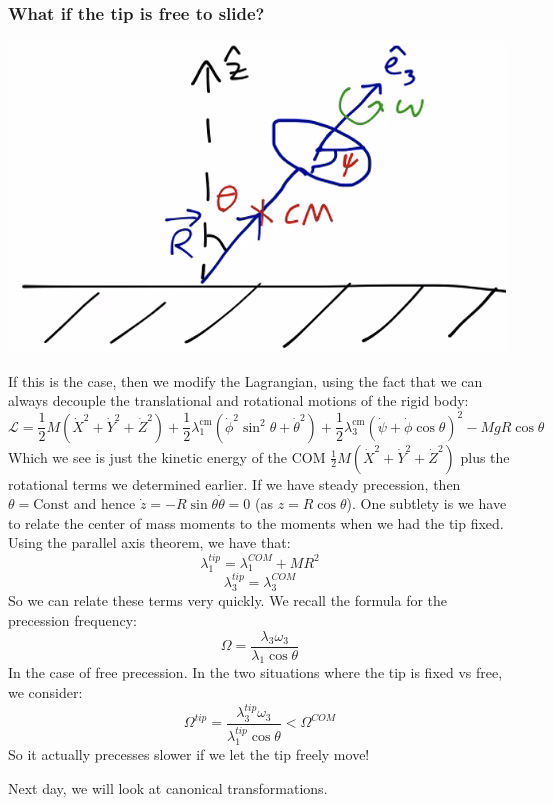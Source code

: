 \documentclass[../PHYS306Notes.tex]{subfiles}
\begin{document}
\subsubsection{What if the tip is free to slide?}
\begin{center}
    \includegraphics[scale=0.7]{Lecture-34/l34-img7.png}
\end{center}
If this is the case, then we modify the Lagrangian, using the fact that we can always decouple the translational and rotational motions of the rigid body:
\[\mathcal{L}=\frac{1}{2} M\left(\dot{X}^{2}+\dot{Y}^{2}+\dot{Z}^{2}\right)+\frac{1}{2} \lambda_{1}^{\mathrm{cm}}\left(\dot{\phi}^{2} \sin ^{2} \theta+\dot{\theta}^{2}\right)+\frac{1}{2} \lambda_{3}^{\mathrm{cm}}(\dot{\psi}+\dot{\phi} \cos \theta)^{2}-M g R \cos \theta\]
Which we see is just the kinetic energy of the COM $\frac{1}{2} M\left(\dot{X}^{2}+\dot{Y}^{2}+\dot{Z}^{2}\right)$ plus the rotational terms we determined earlier. If we have steady precession, then $\theta = \text{Const}$ and hence $\dot{z} = -R\sin\theta\dot{\theta} = 0$ (as $z = R\cos\theta$). One subtlety is we have to relate the center of mass moments to the moments when we had the tip fixed. Using the parallel axis theorem, we have that:
\[\lambda_1^{tip} = \lambda_1^{COM} + MR^2\]
\[\lambda_3^{tip} = \lambda_3^{COM}\]
So we can relate these terms very quickly. We recall the formula for the precession frequency:
\[\Omega = \frac{\lambda_3\omega_3}{\lambda_1\cos\theta}\]
In the case of free precession. In the two situations where the tip is fixed vs free, we consider:
\[\Omega^{tip} = \frac{\lambda_3^{tip}\omega_3}{\lambda_1^{tip}\cos\theta} < \Omega^{COM}\]
So it actually precesses slower if we let the tip freely move!

Next day, we will look at canonical transformations.
\end{document}
